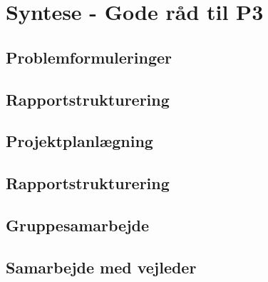 \documentclass[a4paper,12pt,oneside]{article}
\begin{document}
\section{Syntese - Gode råd til P3}
 
\subsection{Problemformuleringer}

\subsection{Rapportstrukturering}

\subsection{Projektplanlægning}

\subsection{Rapportstrukturering}

\subsection{Gruppesamarbejde} 

\subsection{Samarbejde med vejleder}
\end{document}
